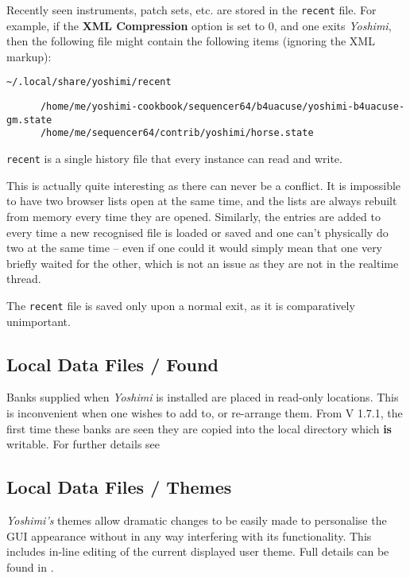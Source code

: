    Recently seen instruments, patch sets, etc. are stored in the
   \texttt{recent} file. For example, if the \textbf{XML Compression} option
   is set to 0, and one exits \textsl{Yoshimi}, then the following file might
   contain the following items (ignoring the XML markup):

   \texttt{\textasciitilde/.local/share/yoshimi/recent}

   \begin{verbatim}
      /home/me/yoshimi-cookbook/sequencer64/b4uacuse/yoshimi-b4uacuse-gm.state
      /home/me/sequencer64/contrib/yoshimi/horse.state
   \end{verbatim}

   \texttt{recent} is a single history file that every instance can read and
   write.

   This is actually quite interesting as there can never be a conflict.  It is
   impossible to have two browser lists open at the same time, and the lists are
   always rebuilt from memory every time they are opened. Similarly, the entries
   are added to every time a new recognised file is loaded or saved and one
   can't physically do two at the same time -- even if one could it would simply
   mean that one very briefly waited for the other, which is not an issue as
   they are not in the realtime thread.

   The \texttt{recent} file is saved only upon a normal exit, as it is
   comparatively unimportant.

\subsection{Local Data Files / Found}
\label{subsec:local_data_found}
   Banks supplied when \textsl{Yoshimi} is installed are placed in read-only
   locations. This is inconvenient when one wishes to add to, or re-arrange
   them. From V 1.7.1, the first time these banks are seen they are copied into
   the local directory which \textbf{is} writable. For further details see

\subsection{Local Data Files / Themes}
\label{subsec:local_data_themes}

   \textsl{Yoshimi's} themes allow dramatic changes to be easily made to personalise
   the GUI appearance without in any way interfering with its functionality. This
   includes in-line editing of the current displayed user theme. Full details can be
   found in .

